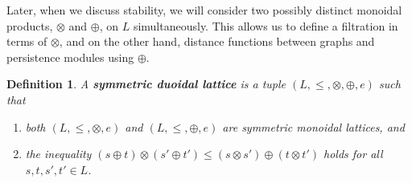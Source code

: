 \documentclass[a4paper,11pt]{article}
\newcommand{\tensor}{\otimes}
\newcommand{\atensor}{\oplus}
\newcounter{dummy}\numberwithin{dummy}{section}
\newtheorem{definition}[dummy]{Definition}
\theoremstyle{remark}
\begin{document}
Later, when we discuss stability, we will consider two possibly distinct monoidal products, $\tensor$ and $\atensor$, on $L$ simultaneously. This allows us to define a filtration in terms of $\tensor$, and on the other hand, distance functions between graphs and persistence modules using $\atensor$.

\begin{definition}   
A \textbf{symmetric duoidal lattice} is a tuple $(L,\leq,\tensor,\atensor, e)$ such that
\begin{enumerate}[label=(SDL\arabic{*}), ref=(SDL\arabic{*}),leftmargin=5.0em]
    \item\label{cond:bl1} both $(L,\leq,\tensor,e)$ and $(L,\leq,\atensor,e)$ are symmetric monoidal lattices, and
    \item\label{cond:bl2} the inequality $(s\atensor t)\tensor(s'\atensor t')\leq (s\tensor s')\atensor(t\tensor t')$ holds for all $s,t,s',t'\in L$.
\end{enumerate}
\end{definition}
\end{document}
